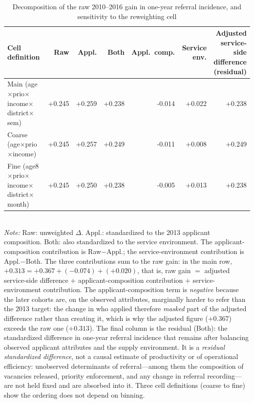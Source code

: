 \begin{table}[htbp]\centering
\caption{Decomposition of the raw 2010--2016 gain in one-year referral incidence, and sensitivity to the reweighting cell}
\label{tab:P3decomp}
\footnotesize
\setlength{\tabcolsep}{4pt}
\begin{tabular}{lrrrrrr}
\toprule
Cell definition & Raw & Appl. & Both & Appl.\ comp. & Service env. & \shortstack[r]{Adjusted\\service-side\\difference\\(residual)} \\
\midrule
Main (age$\times$prio$\times$income$\times$district$\times$sem) & +0.245 & +0.259 & +0.238 & -0.014 & +0.022 & +0.238 \\
Coarse (age$\times$prio$\times$income) & +0.245 & +0.257 & +0.249 & -0.011 & +0.008 & +0.249 \\
Fine (age8$\times$prio$\times$income$\times$district$\times$month) & +0.245 & +0.250 & +0.238 & -0.005 & +0.013 & +0.238 \\
\bottomrule
\end{tabular}
\\[3pt]{\footnotesize \textit{Note:} Raw: unweighted $\Delta$. Appl.: standardized to the 2013 applicant composition. Both: also standardized to the service environment. The applicant-composition contribution is Raw$-$Appl.; the service-environment contribution is Appl.$-$Both. The three contributions sum to the raw gain: in the main row, $+0.313 = +0.367 + (-0.074) + (+0.020)$, that is, raw gain $=$ adjusted service-side difference $+$ applicant-composition contribution $+$ service-environment contribution. The applicant-composition term is \emph{negative} because the later cohorts are, on the observed attributes, marginally harder to refer than the 2013 target: the change in who applied therefore \emph{masked} part of the adjusted difference rather than creating it, which is why the adjusted figure ($+0.367$) exceeds the raw one ($+0.313$). The final column is the residual (Both): the standardized difference in one-year referral incidence that remains after balancing observed applicant attributes and the supply environment. It is a \emph{residual standardized difference}, not a causal estimate of productivity or of operational efficiency: unobserved determinants of referral---among them the composition of vacancies released, priority enforcement, and any change in referral recording---are not held fixed and are absorbed into it. Three cell definitions (coarse to fine) show the ordering does not depend on binning.}
\end{table}

